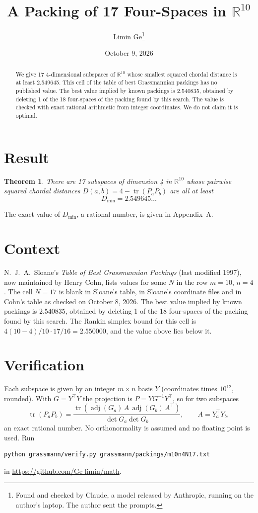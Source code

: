 \documentclass[11pt,a4paper]{article}
\title{A Packing of 17 Four-Spaces in $\mathbb{R}^{10}$}
\author{Limin Ge\thanks{Found and checked by Claude, a model released by Anthropic, running on the author's laptop. The author sent the prompts.}}
\date{October 9, 2026}
\newtheorem*{theorem}{Theorem}
\begin{document}
\maketitle
\begin{abstract}
We give 17 4-dimensional subspaces of $\mathbb{R}^{10}$ whose smallest squared chordal distance is at least 2.549645. This cell of the table of best Grassmannian packings has no published value. The best value implied by known packings is 2.540835, obtained by deleting 1 of the 18 four-spaces of the packing found by this search. The value is checked with exact rational arithmetic from integer coordinates. We do not claim it is optimal.
\end{abstract}

\section{Result}
\begin{theorem}
There are 17 subspaces of dimension 4 in $\mathbb{R}^{10}$ whose pairwise squared chordal distances $D(a,b) = 4 - \operatorname{tr}(P_aP_b)$ are all at least
\[ D_{\min} = 2.549645\ldots \]
\end{theorem}
The exact value of $D_{\min}$, a rational number, is given in Appendix~A.


\section{Context}
N.~J.~A.~Sloane's \emph{Table of Best Grassmannian Packings} (last modified 1997), now maintained by Henry Cohn, lists values for some $N$ in the row $m=10$, $n=4$. The cell $N=17$ is blank in Sloane's table, in Sloane's coordinate files and in Cohn's table as checked on October 8, 2026. The best value implied by known packings is 2.540835, obtained by deleting 1 of the 18 four-spaces of the packing found by this search. The Rankin simplex bound for this cell is $4(10-4)/10\cdot 17/16 = 2.550000$, and the value above lies below it.


\section{Verification}
Each subspace is given by an integer $m\times n$ basis $Y$ (coordinates times $10^{12}$, rounded). With $G=Y^\top Y$ the projection is $P=YG^{-1}Y^\top$, so for two subspaces
\[ \operatorname{tr}(P_aP_b)=\frac{\operatorname{tr}(\operatorname{adj}(G_a)\,A\,\operatorname{adj}(G_b)\,A^\top)}{\det G_a\det G_b},\qquad A=Y_a^\top Y_b, \]
an exact rational number. No orthonormality is assumed and no floating point is used. Run
\begin{verbatim}
python grassmann/verify.py grassmann/packings/m10n4N17.txt
\end{verbatim}
in \url{https://github.com/Ge-limin/math}.
\end{document}
